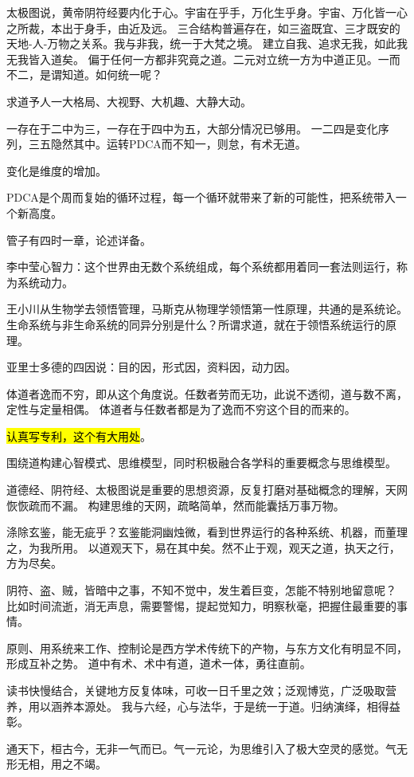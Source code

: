 太极图说，黄帝阴符经要内化于心。宇宙在乎手，万化生乎身。宇宙、万化皆一心之所裁，本出于身手，由近及远。
三合结构普遍存在，如三盗既宜、三才既安的天地-人-万物之关系。我与非我，统一于大梵之境。
建立自我、追求无我，如此我无我皆入道矣。
偏于任何一方都非究竟之道。二元对立统一方为中道正见。一而不二，是谓知道。如何统一呢？

求道予人一大格局、大视野、大机趣、大静大动。

一存在于二中为三，一存在于四中为五，大部分情况已够用。
一二四是变化序列，三五隐然其中。运转PDCA而不知一，则怠，有术无道。

变化是维度的增加。

PDCA是个周而复始的循环过程，每一个循环就带来了新的可能性，把系统带入一个新高度。

管子有四时一章，论述详备。

李中莹心智力：这个世界由无数个系统组成，每个系统都用着同一套法则运行，称为系统动力。

王小川从生物学去领悟管理，马斯克从物理学领悟第一性原理，共通的是系统论。
生命系统与非生命系统的同异分别是什么？所谓求道，就在于领悟系统运行的原理。

亚里士多德的四因说：目的因，形式因，资料因，动力因。

体道者逸而不穷，即从这个角度说。任数者劳而无功，此说不透彻，道与数不离，定性与定量相偶。
体道者与任数者都是为了逸而不穷这个目的而来的。

\hl{认真写专利，这个有大用处}。

围绕道构建心智模式、思维模型，同时积极融合各学科的重要概念与思维模型。

道德经、阴符经、太极图说是重要的思想资源，反复打磨对基础概念的理解，天网恢恢疏而不漏。
构建思维的天网，疏略简单，然而能囊括万事万物。

涤除玄鉴，能无疵乎？玄鉴能洞幽烛微，看到世界运行的各种系统、机器，而董理之，为我所用。
以道观天下，易在其中矣。然不止于观，观天之道，执天之行，方为尽矣。

阴符、盗、贼，皆暗中之事，不知不觉中，发生着巨变，怎能不特别地留意呢？
比如时间流逝，消无声息，需要警惕，提起觉知力，明察秋毫，把握住最重要的事情。

原则、用系统来工作、控制论是西方学术传统下的产物，与东方文化有明显不同，形成互补之势。
道中有术、术中有道，道术一体，勇往直前。

读书快慢结合，关键地方反复体味，可收一日千里之效；泛观博览，广泛吸取营养，用以涵养本源处。
我与六经，心与法华，于是统一于道。归纳演绎，相得益彰。

通天下，桓古今，无非一气而已。气一元论，为思维引入了极大空灵的感觉。气无形无相，用之不竭。

